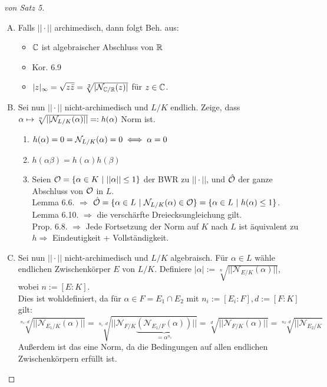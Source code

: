 \begin{proof}[von Satz 5]
\begin{enumerate}[(A)]
\item Falls $||\cdot||$ archimedisch, dann folgt Beh. aus:
\begin{itemize}
\item $\mathbb{C}$ ist algebraischer Abschluss von $\mathbb{R}$
\item Kor. 6.9
\item $|z|_\infty = \sqrt{z \bar{z}} = \sqrt[2]{|\mathcal{N}_{\mathbb{C}/\mathbb{R}}(z)|}$ für $z \in \mathbb{C}$.
\end{itemize}
\item Sei nun $||\cdot||$ nicht-archimedisch und $L/K$ endlich. Zeige, dass $\alpha \mapsto \sqrt[n]{||\mathcal{N}_{L/K}(\alpha)||}=:h(\alpha)$ Norm ist.
\begin{enumerate}[(1)]
\item $h(\alpha)=0=\mathcal{N}_{L/K}(\alpha)=0 \iff \alpha=0$
\item $h(\alpha\beta)=h(\alpha)h(\beta)$
\item Seien $\O=\{\alpha \in K \ | \ ||\alpha|| \leq 1 \}$ der BWR zu $||\cdot||$, und $\hat{\mathcal{O}}$ der ganze Abschluss von $\mathcal{O}$ in $L$.\\
Lemma 6.6. $\Rightarrow$ $\hat{\mathcal{O}}=\{\alpha \in L \ | \ \mathcal{N}_{L/K}(\alpha) \in \mathcal{O}\} = \{\alpha \in L \ | \ h(\alpha) \leq 1\}$.\\
Lemma 6.10. $\Rightarrow$ die verschärfte Dreiecksungleichung gilt.\\
Prop. 6.8. $\Rightarrow$ Jede Fortsetzung der Norm auf $K$ nach $L$ ist äquivalent zu $h \Rightarrow$ Eindeutigkeit + Vollständigkeit.
\end{enumerate}
\item Sei nun $|| \cdot||$ nicht-archimedisch und $L/K$ algebraisch. Für $\alpha \in L$ wähle endlichen Zwischenkörper $E$ von $L/K$. Definiere $|\alpha|:=\sqrt[n]{||\mathcal{N}_{E/K}(\alpha)||}$, wobei $n:=[E:K]$.\\
Dies ist wohldefiniert, da für $\alpha \in F=E_1 \cap E_2$ mit $n_i:=[E_i : F], d:=[F:K]$ gilt:
\[\sqrt[n_1\cdot d]{|| \mathcal{N}_{E_1/K} (\alpha)||}=\sqrt[n_1\cdot d]{|| \mathcal{N}_{F/K}\underbrace{(\mathcal{N}_{E_1/F} (\alpha))}_{=\alpha^{n_1}}||}=\sqrt[d]{||\mathcal{N}_{F/K}(\alpha)||}=\sqrt[n_2\cdot d]{|| \mathcal{N}_{E_2/K}}\]
Außerdem ist das eine Norm, da die Bedingungen auf allen endlichen Zwischenkörpern erfüllt ist.
\end{enumerate}
\end{proof}

